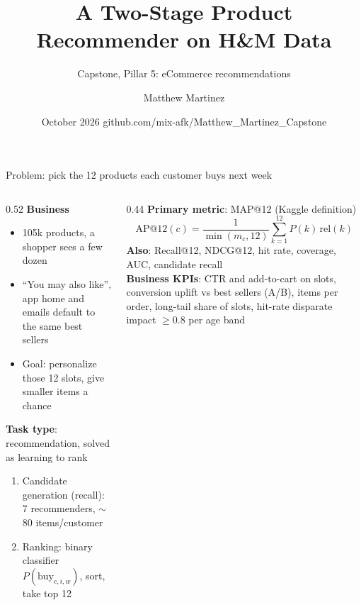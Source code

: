 \documentclass[aspectratio=169,10pt]{beamer}
\title{A Two-Stage Product Recommender on H\&M Data}
\subtitle{Capstone, Pillar 5: eCommerce recommendations}
\author{Matthew Martinez}
\date{October 2026 \quad\textbullet\quad github.com/mix-afk/Matthew\_Martinez\_Capstone}
\begin{document}
\begin{frame}
\titlepage
\end{frame}

\begin{frame}{Problem: pick the 12 products each customer buys next week}
\begin{columns}[T]
\begin{column}{0.52\textwidth}
\textbf{Business}
\begin{itemize}
\item 105k products, a shopper sees a few dozen
\item ``You may also like'', app home and emails default to the same best sellers
\item Goal: personalize those 12 slots, give smaller items a chance
\end{itemize}
\vspace{4pt}
\textbf{Task type}: recommendation, solved as learning to rank
\begin{enumerate}
\item Candidate generation (recall): 7 recommenders, $\sim$80 items/customer
\item Ranking: binary classifier $P(\text{buy}_{c,i,w})$, sort, take top 12
\end{enumerate}
\end{column}
\begin{column}{0.44\textwidth}
\textbf{Primary metric}: MAP@12 (Kaggle definition)
\[
\text{AP@12}(c)=\frac{1}{\min(m_c,12)}\sum_{k=1}^{12}P(k)\,\mathrm{rel}(k)
\]
\small
\textbf{Also}: Recall@12, NDCG@12, hit rate, coverage, AUC, candidate recall\\[4pt]
\textbf{Business KPIs}: CTR and add-to-cart on slots, conversion uplift vs best sellers (A/B), items per order, long-tail share of slots, hit-rate disparate impact $\geq 0.8$ per age band
\end{column}
\end{columns}
\end{frame}
\end{document}
